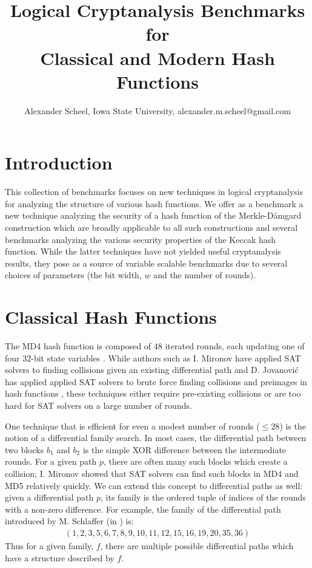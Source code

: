\documentclass[final]{ieee}
\begin{document}
\title{Logical Cryptanalysis Benchmarks for \\ Classical and Modern Hash Functions}
\author{Alexander Scheel, Iowa State University, alexander.m.scheel@gmail.com}

\maketitle
\thispagestyle{empty}
\pagestyle{empty}

\section{Introduction}
This collection of benchmarks focuses on new techniques in logical
cryptanalysis for analyzing the structure of various hash functions. We
offer as a benchmark a new technique analyzing the security of a hash function
of the Merkle-D{\aa}mgard construction which are broadly applicable to all such
constructions and several benchmarks analyzing the various security properties
of the Keccak hash function. While the latter techniques have not yielded
useful cryptanalysis results, they pose as a source of variable scalable
benchmarks due to several choices of parameters (the bit width, $w$ and the
number of rounds).

\section{Classical Hash Functions}
The MD4 hash function is composed of 48 iterated rounds, each updating one of
four 32-bit state variables \cite{rfc1320}. While authors such as I. Mironov
have applied SAT solvers to finding collisions given an existing differential
path \cite{Mironov2006} and D. Jovanovi{\'{c}} has applied applied SAT solvers
to brute force finding collisions and preimages in hash functions
\cite{LogicalAnalysis}, these techniques either require pre-existing
collisions or are too hard for SAT solvers on a large number of rounds.

One technique that is efficient for even a modest number of rounds ($\leq 28$)
is the notion of a differential family search. In most cases, the differential
path between two blocks $b_1$ and $b_2$ is the simple XOR difference between
the intermediate rounds. For a given path $p$, there are often many such blocks
which create a collision; I. Mironov showed that SAT solvers can find such
blocks in MD4 and MD5 \cite{Mironov2006} relatively quickly. We can extend this
concept to differential paths as well: given a differential path $p$, its
family is the ordered tuple of indices of the rounds with a non-zero
difference. For example, the family of the differential path introduced by
M. Schlaffer (in \cite{Schlaffer2006}) is:
\begin{align*}
    (1, 2, 3, 5, 6, 7, 8, 9, 10, 11, 12, 15, 16, 19, 20, 35, 36)
\end{align*}
Thus for a given family, $f$, there are multiple possible differential paths
which have a structure described by $f$.
\end{document}
